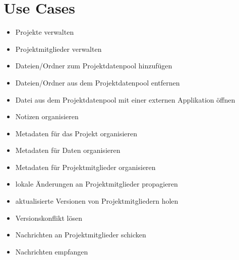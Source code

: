 
\section{Use Cases}


\begin{itemize}

\item Projekte verwalten
\item Projektmitglieder verwalten
\item Dateien/Ordner zum Projektdatenpool hinzufügen
\item Dateien/Ordner aus dem Projektdatenpool entfernen
\item Datei aus dem Projektdatenpool mit einer externen Applikation öffnen
\item Notizen organisieren
\item Metadaten für das Projekt organisieren
\item Metadaten für Daten organisieren
\item Metadaten für Projektmitglieder organisieren
\item lokale Änderungen an Projektmitglieder propagieren
\item aktualisierte Versionen von Projektmitgliedern holen
\item Versionskonflikt lösen
\item Nachrichten an Projektmitglieder schicken
\item Nachrichten empfangen

\end{itemize}